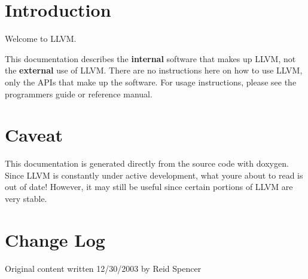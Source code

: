 \hypertarget{index_main_intro}{}\section{Introduction}\label{index_main_intro}
Welcome to L\+L\+VM.

This documentation describes the {\bfseries internal} software that makes up L\+L\+VM, not the {\bfseries external} use of L\+L\+VM. There are no instructions here on how to use L\+L\+VM, only the A\+P\+Is that make up the software. For usage instructions, please see the programmer\textquotesingle{}s guide or reference manual.\hypertarget{index_main_caveat}{}\section{Caveat}\label{index_main_caveat}
This documentation is generated directly from the source code with doxygen. Since L\+L\+VM is constantly under active development, what you\textquotesingle{}re about to read is out of date! However, it may still be useful since certain portions of L\+L\+VM are very stable.\hypertarget{index_main_changelog}{}\section{Change Log}\label{index_main_changelog}

\begin{DoxyItemize}
\item Original content written 12/30/2003 by Reid Spencer 
\end{DoxyItemize}